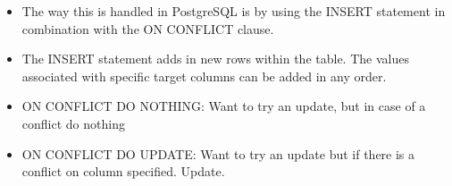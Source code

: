 \documentclass[
	paper=a4,%
	pagesize,%
	8pt, fleqn,%
	headings=small,%
	notitlepage,%
	parskip=never]%
	{scrreprt}
\begin{document}
\begin{multicols*}{3}
\begin{itemize}
\item The way this is handled in PostgreSQL is by using the INSERT statement in combination with the ON CONFLICT clause.

\item The INSERT statement adds in new rows within the table. The values associated with specific target columns can be added in any order.

\item ON CONFLICT DO NOTHING: Want to try an update, but in case of a conflict do nothing

\item ON CONFLICT DO UPDATE: Want to try an update but if there is a conflict on column specified. Update.

\end{itemize}


\nocite{*}
\printbibliography

\end{multicols*}
\end{document}
